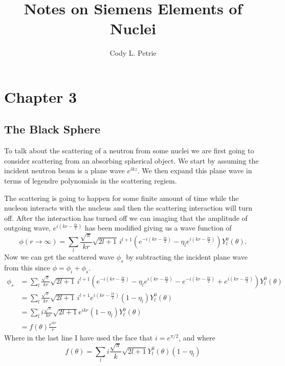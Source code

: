 \documentclass[12pt]{extarticle}
\title{Notes on Siemens Elements of Nuclei}
\author{Cody L. Petrie}
\begin{document}
\maketitle

\section*{Chapter 3}
\subsection*{The Black Sphere}
To talk about the scattering of a neutron from some nuclei we are first going to consider scattering from an absorbing spherical object. We start by assuming the incident neutron beam is a plane wave $e^{ikz}$. We then expand this plane wave in terms of legendre polynomials in the scattering regiem.



The scattering is going to happen for some finite amount of time while the nucleon interacts with the nucleus and then the scattering interaction will turn off. After the interaction has turned off we can imaging that the amplitude of outgoing wave, $e^{i(kr-\frac{l\pi}{2})}$ has been modified giving us a wave function of
\begin{equation}
   \phi(r\rightarrow\infty) = \sum\limits_l \frac{\sqrt{\pi}}{kr} \sqrt{2l+1} \, i^{l+1} \left( e^{-i(kr-\frac{l\pi}{2})} - \eta_l e^{i(kr-\frac{l\pi}{2})} \right) Y_l^0(\theta).
\end{equation}
Now we can get the scattered wave $\phi_s$ by subtracting the incident plane wave from this since $\phi = \phi_i + \phi_s$.
\begin{align}
   \phi_s &= \sum\limits_l \frac{\sqrt{\pi}}{kr} \sqrt{2l+1} \, i^{l+1} \left( e^{-i(kr-\frac{l\pi}{2})} - \eta_l e^{i(kr-\frac{l\pi}{2})} - e^{-i(kr-\frac{l\pi}{2})} + e^{i(kr-\frac{l\pi}{2})} \right) Y_l^0(\theta) \\
   &= \sum\limits_l \frac{\sqrt{\pi}}{kr} \sqrt{2l+1} \, i^{l+1} e^{i(kr-\frac{l\pi}{2})}(1 - \eta_l) Y_l^0(\theta) \\
   &= \sum\limits_l i \frac{\sqrt{\pi}}{kr} \sqrt{2l+1} e^{ikr}(1 - \eta_l) Y_l^0(\theta) \\
   &= f(\theta) \frac{e^{ikr}}{r}
\end{align}
Where in the last line I have used the face that $i=e^{\pi/2}$, and where
\begin{equation}
   f(\theta) = \sum\limits_l i \frac{\sqrt{\pi}}{k}\sqrt{2l+1} Y_l^0(\theta) (1-\eta_l)
\end{equation}
\end{document}
